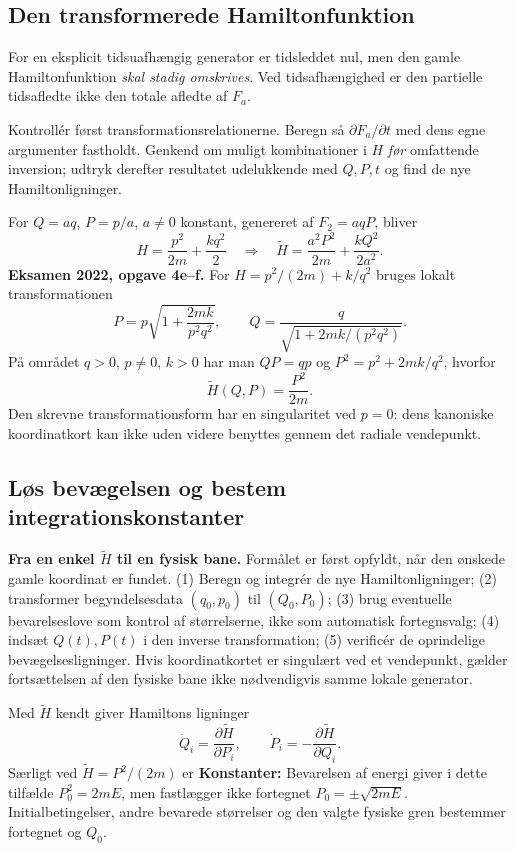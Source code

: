 \subsection{Den transformerede Hamiltonfunktion}\label{sec:newH}
For en eksplicit tidsuafhængig generator er tidsleddet nul, men den gamle Hamiltonfunktion \emph{skal stadig omskrives}. Ved tidsafhængighed er den partielle tidsafledte ikke den totale afledte af $F_a$.
\begin{method}Kontrollér først transformationsrelationerne. Beregn så $\partial F_a/\partial t$ med dens egne argumenter fastholdt. Genkend om muligt kombinationer i $H$ \emph{før} omfattende inversion; udtryk derefter resultatet udelukkende med $Q,P,t$ og find de nye Hamiltonligninger.\end{method}
For $Q=aq$, $P=p/a$, $a\ne0$ konstant, genereret af $F_2=aqP$, bliver
\[
H=\frac{p^2}{2m}+\frac{kq^2}{2}
\quad\Longrightarrow\quad
\widetilde H=\frac{a^2P^2}{2m}+\frac{kQ^2}{2a^2}.
\]
\textbf{Eksamen 2022, opgave 4e--f.} For $H=p^2/(2m)+k/q^2$ bruges lokalt transformationen
\[
P=p\sqrt{1+\frac{2mk}{p^2q^2}},\qquad
Q=\frac{q}{\sqrt{1+2mk/(p^2q^2)}}.
\]
På området $q>0$, $p\ne0$, $k>0$ har man $QP=qp$ og $P^2=p^2+2mk/q^2$, hvorfor
\[
\boxed{\widetilde H(Q,P)=\frac{P^2}{2m}.}
\]
Den skrevne transformationsform har en singularitet ved $p=0$: dens kanoniske koordinatkort kan ikke uden videre benyttes gennem det radiale vendepunkt.

\subsection{Løs bevægelsen og bestem integrationskonstanter}
\textbf{Fra en enkel $\widetilde H$ til en fysisk bane.} Formålet er først opfyldt, når den ønskede gamle koordinat er fundet. (1) Beregn og integrér de nye Hamiltonligninger; (2) transformer begyndelsesdata $(q_0,p_0)$ til $(Q_0,P_0)$; (3) brug eventuelle bevarelseslove som kontrol af størrelserne, ikke som automatisk fortegnsvalg; (4) indsæt $Q(t),P(t)$ i den inverse transformation; (5) verificér de oprindelige bevægelsesligninger. Hvis koordinatkortet er singulært ved et vendepunkt, gælder fortsættelsen af den fysiske bane ikke nødvendigvis samme lokale generator.


Med $\widetilde H$ kendt giver Hamiltons ligninger
\[
\dot Q_i=\frac{\partial\widetilde H}{\partial P_i},\qquad
\dot P_i=-\frac{\partial\widetilde H}{\partial Q_i}.
\]
Særligt ved $\widetilde H=P^2/(2m)$ er
\textbf{Konstanter:} Bevarelsen af energi giver i dette tilfælde $P_0^2=2mE$, men fastlægger ikke fortegnet $P_0=\pm\sqrt{2mE}$. Initialbetingelser, andre bevarede størrelser og den valgte fysiske gren bestemmer fortegnet og $Q_0$.

